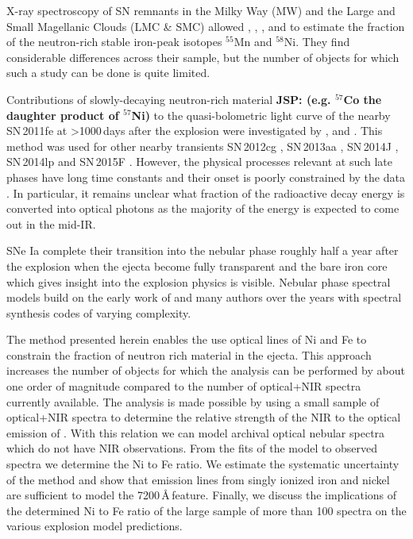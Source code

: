 \documentclass[fleqn,usenatbib]{mnras}
\begin{document}
X-ray spectroscopy of SN remnants in the Milky Way (MW) and the Large and Small Magellanic Clouds (LMC \& SMC) allowed \citet{2013ApJ...767L..10P}, \citet{2014HEAD...1430402Y}, \citet{2015ApJ...801L..31Y}, \citet{2017ApJ...843...35M} and \citet{2019arXiv190605972S} to estimate the fraction of the neutron-rich stable iron-peak isotopes $^{55}$Mn and $^{58}$Ni. They find considerable differences across their sample, but the number of objects for which such a study can be done is quite limited. 

Contributions of slowly-decaying neutron-rich material
{\bf JSP: 
(e.g. $^{57}$Co the daughter product of $^{57}$Ni) 
}
to the quasi-bolometric light curve of the nearby SN\,2011fe at >1000\,days after the explosion were investigated by \citet{2017hst..prop15192S}, \citet{2017MNRAS.468.3798D} and \citet{2017MNRAS.472.2534K}. This method was used for other nearby transients SN\,2012cg \citep{2016ApJ...819...31G}, SN\,2013aa \citep{2018ApJ...857...88J}, SN\,2014J \citep{2018ApJ...852...89Y}, SN\,2014lp \citep{2018ApJ...866...10G} and SN\,2015F \citep{2018ApJ...859...79G}. However, the physical processes relevant at such late phases have long time constants and their onset is poorly constrained by the data \citep{2015ApJ...814L...2F}. In particular, it remains unclear what fraction of the radioactive decay energy is converted into optical photons as the majority of the energy is expected to come out in the mid-IR. 

SNe Ia complete their transition into the nebular phase roughly half a year after the explosion when the ejecta become fully transparent and the bare iron core which gives insight into the explosion physics is visible. Nebular phase spectral models build on the early work of \citet{1980PhDT.........1A} and many  authors over the years \citep{1992MNRAS.258P..53S, 1992ApJ...390..602K, 1994ApJ...426L..89K, 2005A&A...437..983K, 2007Sci...315..825M, 2015ApJ...814L...2F, 2017ApJ...845..176B, 2018MNRAS.477.3567M, 2018ApJ...861..119D} with spectral synthesis codes of varying complexity.

The method presented herein enables the use optical lines of Ni and Fe to constrain the fraction of neutron rich material in the ejecta. This approach increases the number of objects for which the analysis can be performed by about one order of magnitude compared to the number of optical+NIR spectra currently available. The analysis is made possible by using a small sample of optical+NIR spectra to determine the relative strength of the NIR to the optical emission of . With this relation we can model archival optical nebular spectra which do not have NIR observations. From the fits of the model to observed spectra we determine the Ni to Fe ratio. We estimate the systematic uncertainty of the method and show that emission lines from singly ionized iron and nickel are sufficient to model the 7200\,\AA\,feature. Finally, we discuss the implications of the determined Ni to Fe ratio of the large sample of more than 100 spectra on the various explosion model predictions.
\end{document}
